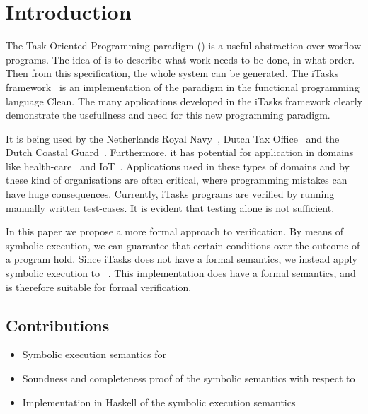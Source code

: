 


\section{Introduction}

The Task Oriented Programming paradigm (\TOP) is a useful abstraction over worflow programs.
The idea of \TOP is to describe what work needs to be done, in what order.
Then from this specification, the whole system can be generated.
The iTasks framework~\cite{DBLP:conf/ppdp/PlasmeijerLMAK12} is an implementation of the paradigm in the functional programming language Clean.
The many applications developed in the iTasks framework clearly demonstrate the usefullness and need for this new programming paradigm.

It is being used by the Netherlands Royal Navy~\cite{jansen2018dynamic}, Dutch Tax Office~\cite{} and the Dutch Coastal Guard~\cite{lijnse2012incidone}. %
Furthermore, it has potential for application in domains like health-care~\cite{} and IoT~\cite{DBLP:conf/cgo/KoopmanLP18}.
Applications used in these types of domains and by these kind of organisations are often critical, where programming mistakes can have huge consequences.
Currently, iTasks programs are verified by running manually written test-cases. %
It is evident that testing alone is not sufficient.

In this paper we propose a more formal approach to verification.
By means of symbolic execution, we can guarantee that certain conditions over the outcome of a \TOP program hold.
Since iTasks does not have a formal semantics, we instead apply symbolic execution to \TOPHAT~\cite{}.
This \TOP implementation does have a formal semantics, and is therefore suitable for formal verification.

\subsection{Contributions}

\begin{itemize}
  \item Symbolic execution semantics for \TOPHAT
  \item Soundness and completeness proof of the symbolic semantics with respect to \TOPHAT
  \item Implementation in Haskell of the symbolic execution semantics
\end{itemize}

